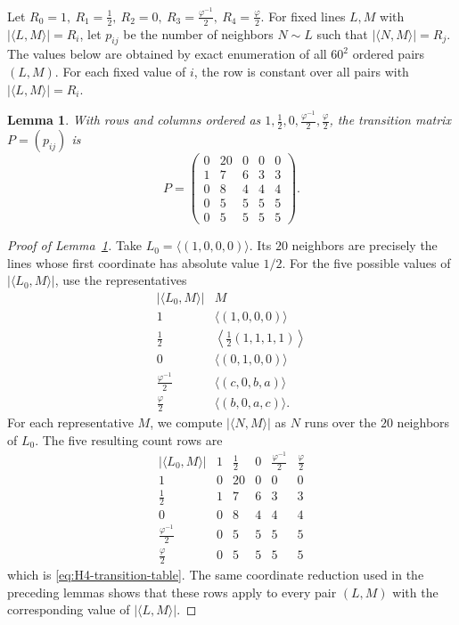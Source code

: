 \documentclass[11pt]{article}
\newtheorem{lemma}[theorem]{Lemma}
\theoremstyle{definition}
\begin{document}
Let
\(
    R_{0}=1,\ R_{1}=\frac{1}{2},\ R_{2}=0,\ R_{3}=\frac{\varphi^{-1}}{2},\ R_{4}=\frac{\varphi}{2}.
\)
For fixed lines \(L,M\) with \(|\langle L,M\rangle|=R_{i}\), let \(p_{ij}\)
be the number of neighbors \(N\sim L\) such that
\(|\langle N,M\rangle|=R_{j}\).  The values below are obtained by exact
enumeration of all \(60^{2}\) ordered pairs \((L,M)\).  For each fixed
value of \(i\), the row is constant over all pairs with
\(|\langle L,M\rangle|=R_{i}\).

\begin{lemma}\label{lem:app-H4-transition-table}
With rows and columns ordered as
\(1,\frac{1}{2},0,\frac{\varphi^{-1}}{2},\frac{\varphi}{2}\), the transition
matrix \(P=(p_{ij})\) is
\begin{equation}\label{eq:H4-transition-table}
P=
\begin{pmatrix}
0&20&0&0&0\\
1&7&6&3&3\\
0&8&4&4&4\\
0&5&5&5&5\\
0&5&5&5&5
\end{pmatrix}.
\end{equation}
\end{lemma}

\begin{proof}[Proof of Lemma~\ref{lem:app-H4-transition-table}]
Take \(L_{0}=\langle(1,0,0,0)\rangle\).  Its \(20\) neighbors are precisely
the lines whose first coordinate has absolute value \(1/2\).  For the five
possible values of \(|\langle L_{0},M\rangle|\), use the representatives
\[
\begin{array}{c|c}
|\langle L_{0},M\rangle| & M\\
\hline
1 & \langle(1,0,0,0)\rangle\\
\frac{1}{2} & \left\langle\frac{1}{2}(1,1,1,1)\right\rangle\\
0 & \langle(0,1,0,0)\rangle\\
\frac{\varphi^{-1}}{2} &
\langle(c,0,b,a)\rangle\\
\frac{\varphi}{2} &
\langle(b,0,a,c)\rangle .
\end{array}
\]
For each representative \(M\), we compute
\(|\langle N,M\rangle|\) as \(N\) runs over the \(20\) neighbors of
\(L_{0}\).  The five resulting count rows are
\[
\begin{array}{c|ccccc}
|\langle L_{0},M\rangle|
& 1 & \frac{1}{2} & 0 & \frac{\varphi^{-1}}{2} & \frac{\varphi}{2}\\
\hline
1 & 0 & 20 & 0 & 0 & 0\\
\frac{1}{2} & 1 & 7 & 6 & 3 & 3\\
0 & 0 & 8 & 4 & 4 & 4\\
\frac{\varphi^{-1}}{2} & 0 & 5 & 5 & 5 & 5\\
\frac{\varphi}{2} & 0 & 5 & 5 & 5 & 5
\end{array}
\]
which is \eqref{eq:H4-transition-table}.  The same coordinate reduction
used in the preceding lemmas shows that these rows apply to every pair
\((L,M)\) with the corresponding value of \(|\langle L,M\rangle|\).
\end{proof}
\end{document}
